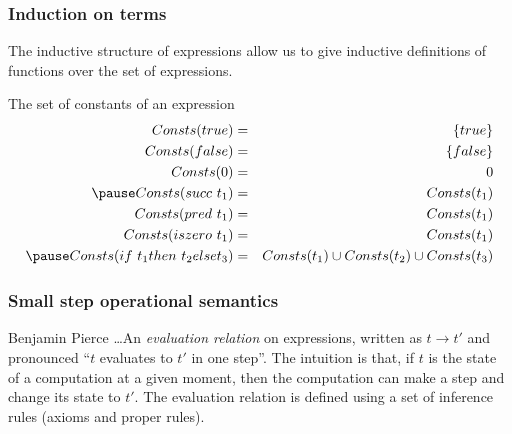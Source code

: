 \documentclass{beamer}
\begin{document}
\begin{frame}
\frametitle{Induction on terms} 

The inductive structure of expressions allow us 
to give inductive definitions of functions over 
the set of expressions. 

\begin{definition}{{\color{blue}The set of constants of an expression}}
\begin{eqnarray*}
Consts(true)         & = & \{true\}         \\
Consts(false)        & = & \{false\}        \\
Consts(0)            & = & {0}            \\ \pause 
Consts(succ\ t_1)    & = & Consts(t_1)    \\ 
Consts(pred\ t_1)    & = & Consts(t_1)    \\ 
Consts(iszero\ t_1)  & = & Consts(t_1)    \\ \pause 
Consts(if\ t_1 then\ t_2 else t_3) & = & Consts(t_1) \cup Consts(t_2) \cup Consts(t_3) \\  
\end{eqnarray*}

\end{definition} 
\end{frame}

\begin{frame}
\frametitle{Small step operational semantics}


\begin{shadequote}[l]{Benjamin Pierce}
\ldots An \emph{evaluation relation} on expressions, written 
as $t \rightarrow t'$ and pronounced ``$t$ evaluates to $t'$ in 
one step''. The intuition is that, if $t$ is the state of a 
computation at a given moment, then the computation can make 
a step and change its state to $t'$. The evaluation relation 
is defined using a set of inference rules (axioms and proper rules). 
\end{shadequote}

\end{frame}
\end{document}
